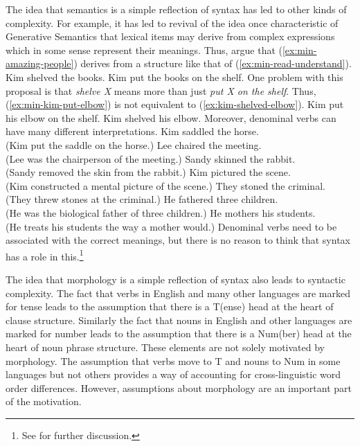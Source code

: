 \documentclass[output=paper]{langsci/langscibook}
\begin{document}
The idea that semantics is a simple reflection of syntax has led to other kinds of complexity. For example, it has led to revival of the idea once characteristic of Generative Semantics that lexical items may derive from complex expressions which in some sense represent their meanings. Thus, \citet{HK93a-u} argue that (\ref{ex:min-amazing-people}) derives from a structure like that of (\ref{ex:min-read-understand}).
\eal
\ex Kim shelved the books.\label{ex:min-kim-shelved}
\ex Kim put the books on the shelf.\label{ex:min-kim-put}
\zl
One problem with this proposal is that \textit{shelve X} means more than just \textit{put X on the shelf}. Thus, (\ref{ex:min-kim-put-elbow}) is not equivalent to (\ref{ex:kim-shelved-elbow}).
\eal 
\ex Kim put his elbow on the shelf.\label{ex:min-kim-put-elbow}
\ex Kim shelved his elbow.\label{ex:kim-shelved-elbow}
\zl 
Moreover, denominal verbs can have many different interpretations.
\eal
\ex Kim saddled the horse.\\
(Kim put the saddle on the horse.)\label{ex:min-kim-saddled}
\ex Lee chaired the meeting.\\
(Lee was the chairperson of the meeting.)\label{ex:min-lee-chaired}
\ex Sandy skinned the rabbit.\\
(Sandy removed the skin from the rabbit.)\label{ex:min-sandy-skinned}
\ex Kim pictured the scene.\\
(Kim constructed a mental picture of the scene.)\label{ex:min-kim-pictured}
\ex They stoned the criminal.\\
(They threw stones at the criminal.)\label{ex:min-they-stoned}
\ex He fathered three children.\\
(He was the biological father of three children.)\label{ex:min-he-fathered}
\ex He mothers his students.\\
(He treats his students the way a mother would.)\label{ex:min-he-mothers}
\zl
Denominal verbs need to be associated with the correct meanings, but there is no reason to think that syntax has a role in this.\footnote{%
See \citet[53--56]{CJ2005a} for further discussion.%
}

The idea that morphology is a simple reflection of syntax also leads to syntactic complexity. The
fact that verbs in English and many other languages are marked for tense leads to the assumption
that there is a T(ense) head at the heart of clause structure. Similarly the fact that nouns in
English and other languages are marked for number leads to the assumption that there is a Num(ber)
head at the heart of noun phrase structure. These elements are not solely motivated by
morphology. The assumption that verbs move to T and nouns to Num in some languages but not others
provides a way of accounting for cross-linguistic word order differences. However, assumptions about
morphology are an important part of the motivation.
\end{document}
